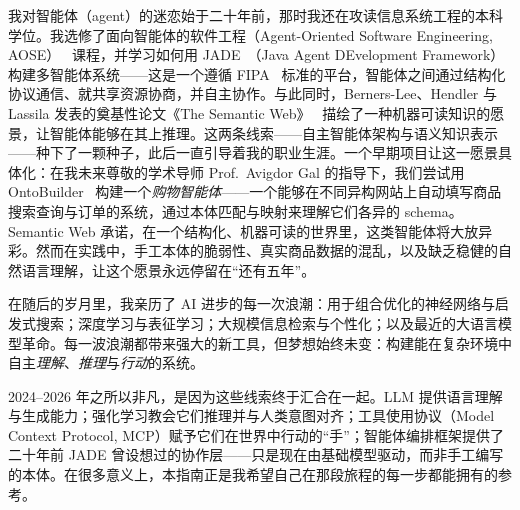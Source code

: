 \documentclass[11pt,a4paper,openany]{book}
\begin{document}
我对智能体（agent）的迷恋始于二十年前，那时我还在攻读信息系统工程的本科学位。我选修了面向智能体的软件工程（Agent-Oriented Software Engineering, AOSE）~\cite{wooldridge2000gaia} 课程，并学习如何用 JADE~\cite{bellifemine2007jade}（Java Agent DEvelopment Framework）构建多智能体系统——这是一个遵循 FIPA~\cite{fipa2002acl} 标准的平台，智能体之间通过结构化协议通信、就共享资源协商，并自主协作。与此同时，Berners-Lee、Hendler 与 Lassila 发表的奠基性论文《The Semantic Web》~\cite{bernerslee2001semantic} 描绘了一种机器可读知识的愿景，让智能体能够在其上推理。这两条线索——自主智能体架构与语义知识表示——种下了一颗种子，此后一直引导着我的职业生涯。一个早期项目让这一愿景具体化：在我未来尊敬的学术导师 Prof.~Avigdor Gal 的指导下，我们尝试用 OntoBuilder~\cite{gal2006ontobuilder} 构建一个\emph{购物智能体}——一个能够在不同异构网站上自动填写商品搜索查询与订单的系统，通过本体匹配与映射来理解它们各异的 schema。Semantic Web 承诺，在一个结构化、机器可读的世界里，这类智能体将大放异彩。然而在实践中，手工本体的脆弱性、真实商品数据的混乱，以及缺乏稳健的自然语言理解，让这个愿景永远停留在“还有五年”。

在随后的岁月里，我亲历了 AI 进步的每一次浪潮：用于组合优化的神经网络与启发式搜索；深度学习与表征学习；大规模信息检索与个性化；以及最近的大语言模型革命。每一波浪潮都带来强大的新工具，但梦想始终未变：构建能在复杂环境中自主\emph{理解}、\emph{推理}与\emph{行动}的系统。

2024--2026 年之所以非凡，是因为这些线索终于汇合在一起。LLM 提供语言理解与生成能力；强化学习教会它们推理并与人类意图对齐；工具使用协议（Model Context Protocol, MCP）赋予它们在世界中行动的“手”；智能体编排框架提供了二十年前 JADE 曾设想过的协作层——只是现在由基础模型驱动，而非手工编写的本体。在很多意义上，本指南正是我希望自己在那段旅程的每一步都能拥有的参考。
\end{document}
